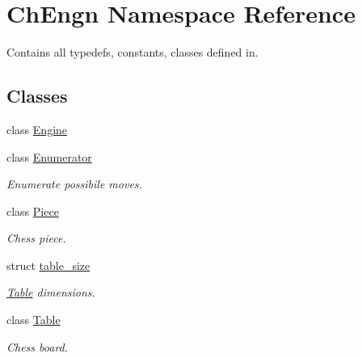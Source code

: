 \hypertarget{namespaceChEngn}{
\section{ChEngn Namespace Reference}
\label{namespaceChEngn}
}


Contains all typedefs, constants, classes defined in.  


\subsection*{Classes}
\begin{DoxyCompactItemize}
\item 
class \hyperlink{classChEngn_1_1Engine}{Engine}
\item 
class \hyperlink{classChEngn_1_1Enumerator}{Enumerator}
\begin{DoxyCompactList}\small\item\em Enumerate possibile moves. \item\end{DoxyCompactList}\item 
class \hyperlink{classChEngn_1_1Piece}{Piece}
\begin{DoxyCompactList}\small\item\em Chess piece. \item\end{DoxyCompactList}\item 
struct \hyperlink{structChEngn_1_1table__size}{table\_\-size}
\begin{DoxyCompactList}\small\item\em \hyperlink{classChEngn_1_1Table}{Table} dimensions. \item\end{DoxyCompactList}\item 
class \hyperlink{classChEngn_1_1Table}{Table}
\begin{DoxyCompactList}\small\item\em Chess board. \item\end{DoxyCompactList}\end{DoxyCompactItemize}

